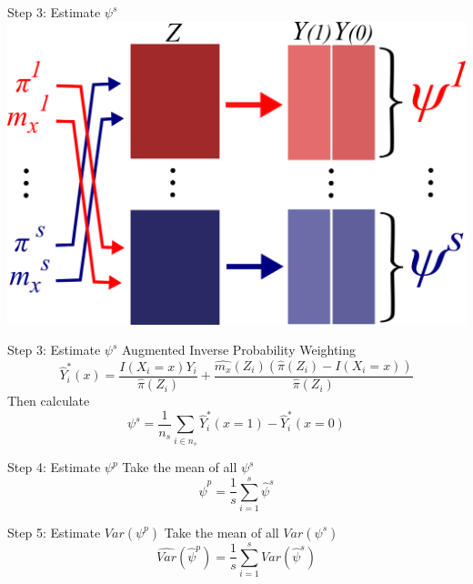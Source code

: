 \documentclass{beamer}
\begin{document}
\begin{frame}{Step 3: Estimate $\psi^s$}
	\centering
	\includegraphics[scale=0.65]{images/step3_psi.png}
\end{frame}

\begin{frame}{Step 3: Estimate $\psi^s$}
	Augmented Inverse Probability Weighting
	\[\widehat{Y}^*_i(x) = \frac{I(X_i=x) Y_i}{\widehat{\pi}(Z_i)} + \frac{\widehat{m_x}(Z_i) (\widehat{\pi}(Z_i) - I(X_i=x))}{\widehat{\pi}(Z_i)}\]
	Then calculate
	\[\psi^s = \frac{1}{n_s} \sum_{i\in n_s} \widehat{Y}^*_i(x=1) - \widehat{Y}^*_i(x=0)\]
\end{frame}


\begin{frame}{Step 4: Estimate $\psi^p$}
	Take the mean of all $\psi^s$
	\[\hat{\psi}^p = \frac{1}{s} \sum_{i=1}^{s} \hat{\psi}^s\]
\end{frame}

\begin{frame}{Step 5: Estimate $Var(\psi^p)$}
	Take the mean of all $Var(\psi^s)$
	\[\widehat{Var}(\hat{\psi}^p) = \frac{1}{s} \sum_{i=1}^{s} \widehat{Var}(\hat{\psi}^s)\]	
\end{frame}
\end{document}
